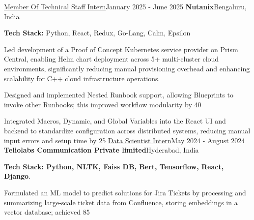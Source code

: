 \resumeSubHeadingListStart
    \resumeSubheading
      {\href{https://drive.google.com/file/d/1fhqgI6ju6VdGSqkf6CPlYzU2w97n2q2-/view?usp=drive_link}{Member Of Technical Staff Intern}}{January 2025 - June 2025}
      {\textbf{Nutanix}}{Bengaluru, India}
      \resumeItemListStart
        \item \textbf{Tech Stack:} Python, React, Redux, Go-Lang, Calm, Epsilon
        \item Led development of a Proof of Concept Kubernetes service provider on Prism Central, enabling Helm chart deployment across 5+ multi-cluster cloud environments, significantly reducing manual provisioning overhead and enhancing scalability for C++ cloud infrastructure operations.
        \item Designed and implemented Nested Runbook support, allowing Blueprints to invoke other Runbooks; this improved workflow modularity by 40%
        \item Integrated Macros, Dynamic, and Global Variables into the React UI and backend to standardize configuration across distributed systems, reducing manual input errors and setup time by 25%
      \resumeItemListEnd
    \resumeSubheading
      {\href{https://drive.google.com/file/d/1Fpkl9hBbqGKuNxbl2WrzFqah6iefmgrF/view?usp=drive_link}{Data Scientist Intern}}{May 2024 - August 2024}
      {\textbf{Teliolabs Communication Private limited}}{Hyderabad, India}
      \resumeItemListStart
        \item \textbf{Tech Stack: Python, NLTK, Faiss DB, Bert, Tensorflow, React, Django}.
        \item Formulated an ML model to predict solutions for Jira Tickets by processing and summarizing large-scale ticket data from Confluence, storing embeddings in a vector database; achieved 85%
      \resumeItemListEnd
\resumeSubHeadingListEnd
